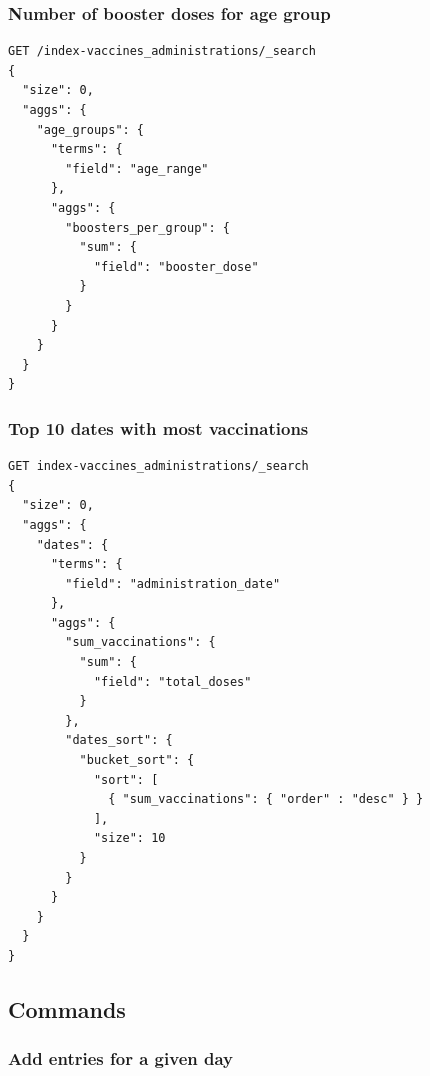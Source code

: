 \documentclass[12pt, a4paper]{article}
\begin{document}
\subsubsection{Number of booster doses for age group}

\begin{tcolorbox}[fontupper=\scriptsize]
    \begin{verbatim}
GET /index-vaccines_administrations/_search
{
  "size": 0,
  "aggs": {
    "age_groups": {
      "terms": { 
        "field": "age_range" 
      },
      "aggs": {
        "boosters_per_group": {
          "sum": {
            "field": "booster_dose"
          }
        }
      }
    }
  }
}
    \end{verbatim}
\end{tcolorbox}

\noindent
\blindtext

\subsubsection{Top 10 dates with most vaccinations}

\begin{tcolorbox}[fontupper=\scriptsize]
    \begin{verbatim}
GET index-vaccines_administrations/_search
{
  "size": 0,
  "aggs": {
    "dates": {
      "terms": { 
        "field": "administration_date" 
      },
      "aggs": {
        "sum_vaccinations": {
          "sum": {
            "field": "total_doses"
          }
        },
        "dates_sort": {
          "bucket_sort": {
            "sort": [
              { "sum_vaccinations": { "order" : "desc" } }
            ],
            "size": 10
          }
        }
      }
    }
  }
}
    \end{verbatim}
\end{tcolorbox}

\noindent
\blindtext

\subsection{Commands}


\subsubsection{Add entries for a given day}

\begin{tcolorbox}[fontupper=\scriptsize]
    \begin{verbatim}
    \end{verbatim}
\end{tcolorbox}
\end{document}
